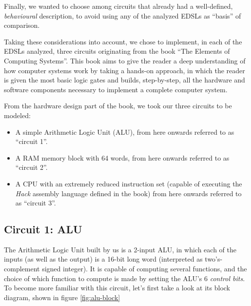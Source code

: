 \documentclass[a4paper]{article}
\begin{document}
        Finally, we wanted to choose among circuits that already had a well-defined,
        \emph{behavioural} description, to avoid using any of the analyzed EDSLs as ``basis'' of
        comparison.

        Taking these considerations into account, we chose to implement, in each of the EDSLs
        analyzed, three circuits originating from the book ``The Elements of Computing
        Systems''\cite{nand2tetris-book}. This book aims to give the reader a deep understanding of
        how computer systems work by taking a hands-on approach, in which the reader is given the
        most basic logic gates and builds, step-by-step, all the hardware and software components
        necessary to implement a complete computer system.

        From the hardware design part of the book, we took our three circuits to be modeled:

        \begin{itemize}
            \item A simple Arithmetic Logic Unit (ALU), from here onwards referred to
                as ``circuit 1''.
            \item A RAM memory block with 64 words, from here onwards referred to as ``circuit 2''.
            \item A CPU with an extremely reduced instruction set (capable of executing the
                \emph{Hack} assembly language defined in the book) from here onwards referred to as
                ``circuit 3''.
        \end{itemize}

        \subsection{Circuit 1: ALU}
        \label{subsec:circuit-alu}
            The Arithmetic Logic Unit built by us is a 2-input ALU, in which each of the inputs (as
            well as the output) is a 16-bit long word (interpreted as two's-complement signed
            integer). It is capable of computing several functions, and the choice of which
            function to compute is made by setting the ALU's 6 \emph{control bits}. To become more
            familiar with this circuit, let's first take a look at its block diagram, shown in
            figure \ref{fig:alu-block}
\end{document}
